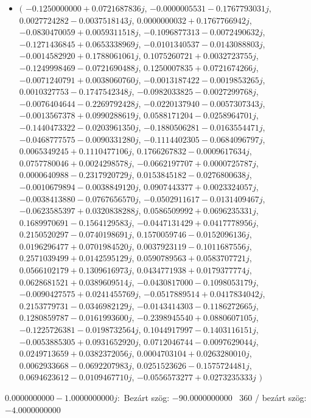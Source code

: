 \documentclass[14pt,a4paper]{article}
\begin{document}
\begin{itemize}
\item
$\big($
$-0.1250000000+0.0721687836j$, $-0.0000005531-0.1767793031j$, $0.0027724282-0.0037518143j$, $0.0000000032+0.1767766942j$, $-0.0830470059+0.0059311518j$, $-0.1096877313-0.0072490632j$, $-0.1271436845+0.0653338969j$, $-0.0101340537-0.0143088803j$, $-0.0014582920+0.1788061061j$, $0.1075260721+0.0032723755j$, $-0.1249998469-0.0721690488j$, $0.1250007835+0.0721674266j$, $-0.0071240791+0.0038060760j$, $-0.0013187422-0.0019853265j$, $0.0010327753-0.1747542348j$, $-0.0982033825-0.0027299768j$, $-0.0076404644-0.2269792428j$, $-0.0220137940-0.0057307343j$, $-0.0013567378+0.0990288619j$, $0.0588171204-0.0258964701j$, $-0.1440473322-0.0203961350j$, $-0.1880506281-0.0163554471j$, $-0.0468777575-0.0090331280j$, $-0.1114402305-0.0684096797j$, $0.0065349245+0.1110477106j$, $0.1766267832-0.0009617634j$, $0.0757780046+0.0024298578j$, $-0.0662197707+0.0000725787j$, $0.0000640988-0.2317920729j$, $0.0153845182-0.0276800638j$, $-0.0010679894-0.0038849120j$, $0.0907443377+0.0023324057j$, $-0.0038413880-0.0767656570j$, $-0.0502911617-0.0131409467j$, $-0.0623585397+0.0320838288j$, $0.0586509992+0.0696235331j$, $0.1689970691-0.1564129583j$, $-0.0447131429+0.0417778956j$, $0.2150520297-0.0740198691j$, $0.1570059746-0.0152096136j$, $0.0196296477+0.0701984520j$, $0.0037923119-0.1011687556j$, $0.2571039499+0.0142595129j$, $0.0590789563+0.0583707721j$, $0.0566102179+0.1309616973j$, $0.0434771938+0.0179377774j$, $0.0628681521+0.0389609514j$, $-0.0430817000-0.1098053179j$, $-0.0090427575+0.0241455769j$, $-0.0517889514+0.0417834042j$, $0.2153779731-0.0346982129j$, $-0.0143414303-0.1186272665j$, $0.1280859787-0.0161993600j$, $-0.2398945540+0.0880607105j$, $-0.1225726381-0.0198732564j$, $0.1044917997-0.1403116151j$, $-0.0053885305+0.0931652920j$, $0.0712046744-0.0097629044j$, $0.0249713659+0.0382372056j$, $0.0004703104+0.0263280010j$, $0.0062933668-0.0692207983j$, $0.0251523626-0.1575724481j$, $0.0694623612-0.0109467710j$, $-0.0556573277+0.0273235333j$
$\big)$
\end{itemize}
$0.0000000000-1.0000000000j$:\
Bezárt szög: $-90.0000000000$ \
360 / bezárt szög: $-4.0000000000$\
\end{document}
